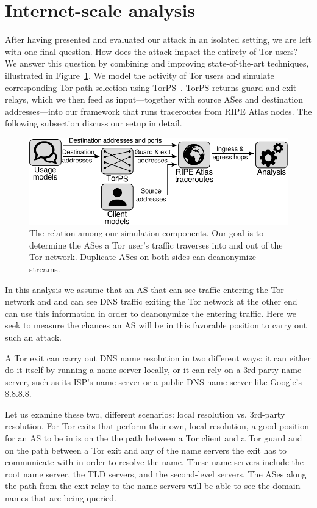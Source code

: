 \section{Internet-scale analysis}
\label{sec:internet-scale}
After having presented and evaluated our attack in an isolated setting, we are
left with one final question.  How does the attack impact the entirety of Tor
users?  We answer this question by combining and improving state-of-the-art
techniques, illustrated in Figure~\ref{fig:simulations}.  We model the activity
of Tor users and simulate corresponding Tor path selection using
TorPS~\cite{TorPS}.  TorPS returns guard and exit relays, which we then feed as
input---together with source ASes and destination addresses---into our framework that
runs traceroutes from RIPE Atlas nodes.  The following subsection discuss our
setup in detail.

\begin{figure}[t]
	\centering
	\includegraphics[width=\linewidth]{figures/simulations.pdf}
	\caption{The relation among our simulation components.  Our goal is to
	determine the ASes a Tor user's traffic traverses into and out of the Tor
	network.  Duplicate ASes on both sides can deanonymize streams.}
	\label{fig:simulations}
\end{figure}

In this analysis we assume that an AS that can see traffic entering the Tor network and 
and can see DNS traffic exiting the Tor network at the other end can use this 
information in order to deanonymize the 
entering traffic.  Here we seek to measure the chances an AS will be in this favorable 
position to carry out such an attack.

A Tor exit can carry out DNS name resolution in two different ways: it can either do it
itself by running a name server locally, or it can rely on a 3rd-party name server, 
such as its ISP's name server or a public DNS name server like Google's 8.8.8.8.

Let us examine these two, different scenarios: local resolution vs. 3rd-party 
resolution.  For Tor exits that perform their own, local resolution, 
a good position for an AS to be in is on the the path between 
a Tor client and a Tor guard and on the path between a Tor exit and any of the name 
servers the exit has to communicate with in order to resolve the name.  These name servers 
include the root name server, the TLD servers, and the second-level servers.  
The ASes along the path from the exit relay to the name servers will be able to see the domain 
names that are being queried.

